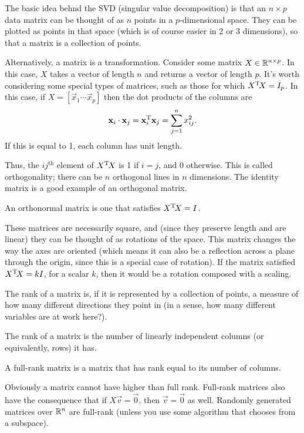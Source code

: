 The basic idea behnd the SVD (singular value decomposition) is that an $n\times p$ data matrix can be thought of as $n$ points in a $p$-dimensional space. They can be plotted as points in that space (which is of course easier in 2 or 3 dimensions), so that a matrix is a collection of points.

Alternatively, a matrix is a transformation. Consider some matrix $X\in\mathbb{R}^{n\times p}$. In this case, $X$ takes a vector of length $n$ and returns a vector of length $p$. It's worth considering some special types of matrices, such as those for which $X^{\mathrm{T}}\! X = I_p$. In this case, if $X = [\vec x_1 \dotsb \vec x_p]$ then the dot products of the columns are
\[\mathbf x_i\cdot \mathbf x_j = \mathbf x_i^{\mathrm{T}}\mathbf x_j = \sum_{j=1}^n x_{ij}^2.\]
If this is equal to 1, each column has unit length.

Thus, the $ij^{\mathrm{th}}$ element of $X^{\mathrm{T}}\! X$ is 1 if $i = j$, and 0 otherwise. This is called orthogonality; there can be $n$ orthogonal lines in $n$ dimensions. The identity matrix is a good example of an orthogonal matrix.
\begin{defn}
An orthonormal matrix is one that satisfies $X^{\mathrm{T}}\! X = I$.
\end{defn}
These matrices are necessarily square, and (since they preserve length and are linear) they can be thought of as rotations of the space. This matrix changes the way the axes are oriented (which means it can also be a reflection across a plane through the origin, since this is a special case of rotation). If the matrix satisfied $X^{\mathrm{T}}\! X = kI$, for a scalar $k$, then it would be a rotation composed with a scaling.

The rank of a matrix is, if it is represented by a collection of points, a measure of how many different directions they point in (in a sense, how many different variables are at work here?).
\begin{defn}
The rank of a matrix is the number of linearly independent columns (or equivalently, rows) it has.
\end{defn}
\begin{defn}
A full-rank matrix is a matrix that has rank equal to its number of columns.
\end{defn}
Obviously a matrix cannot have higher than full rank. Full-rank matrices also have the consequence that if $X\vec v = \vec 0$, then $\vec v = \vec 0$ as well. Randomly generated matrices over $\mathbb{R}^n$ are full-rank (unless you use some algorithm that chooses from a subspace).

